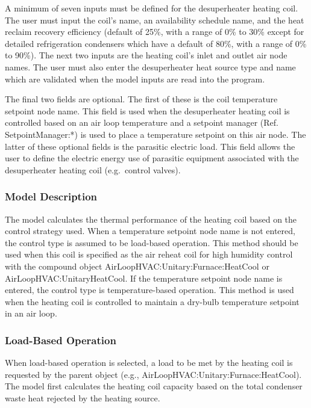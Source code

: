 A minimum of seven inputs must be defined for the desuperheater heating coil. The user must input the coil's name, an availability schedule name, and the heat reclaim recovery efficiency (default of 25\%, with a range of 0\% to 30\% except for detailed refrigeration condensers which have a default of 80\%, with a range of 0\% to 90\%). The next two inputs are the heating coil's inlet and outlet air node names. The user must also enter the desuperheater heat source type and name which are validated when the model inputs are read into the program.

The final two fields are optional. The first of these is the coil temperature setpoint node name. This field is used when the desuperheater heating coil is controlled based on an air loop temperature and a setpoint manager (Ref. SetpointManager:*) is used to place a temperature setpoint on this air node. The latter of these optional fields is the parasitic electric load. This field allows the user to define the electric energy use of parasitic equipment associated with the desuperheater heating coil (e.g.~control valves).

\subsubsection{Model Description}\label{model-description-6}

The model calculates the thermal performance of the heating coil based on the control strategy used. When a temperature setpoint node name is not entered, the control type is assumed to be load-based operation. This method should be used when this coil is specified as the air reheat coil for high humidity control with the compound object AirLoopHVAC:Unitary:Furnace:HeatCool or AirLoopHVAC:UnitaryHeatCool. If the temperature setpoint node name is entered, the control type is temperature-based operation. This method is used when the heating coil is controlled to maintain a dry-bulb temperature setpoint in an air loop.

\subsubsection{Load-Based Operation}\label{load-based-operation}

When load-based operation is selected, a load to be met by the heating coil is requested by the parent object (e.g., AirLoopHVAC:Unitary:Furnace:HeatCool). The model first calculates the heating coil capacity based on the total condenser waste heat rejected by the heating source.

